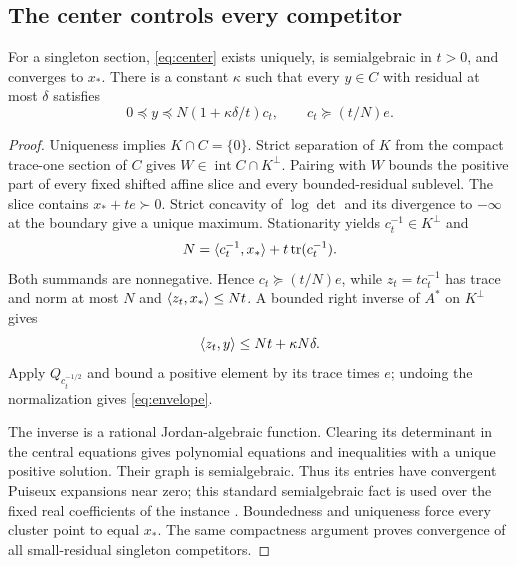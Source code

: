 \subsection{The center controls every competitor}
\begin{lemma}\label{lem:envelope}
For a singleton section, \eqref{eq:center} exists uniquely, is semialgebraic in $t>0$, and converges to $x_*$. There is a constant $\kappa$ such that every $y\in C$ with residual at most $\delta$ satisfies
\begin{equation}\label{eq:envelope}
 0\preceq y\preceq N(1+\kappa\delta/t)c_t,
 \qquad c_t\succeq(t/N)e.
\end{equation}
\end{lemma}
\begin{proof}
Uniqueness implies $K\cap C=\{0\}$. Strict separation of $K$ from the compact trace-one section of $C$ gives $W\in\operatorname{int}C\cap K^\perp$. Pairing with $W$ bounds the positive part of every fixed shifted affine slice and every bounded-residual sublevel. The slice contains $x_*+te\succ0$. Strict concavity of $\log\det$ and its divergence to $-\infty$ at the boundary give a unique maximum. Stationarity yields $c_t^{-1}\in K^\perp$ and
\begin{equation}\label{eq:trace}
 N=\langle c_t^{-1},x_*\rangle+t\operatorname{tr}(c_t^{-1}).
\end{equation}
Both summands are nonnegative. Hence $c_t\succeq(t/N)e$, while $z_t=tc_t^{-1}$ has trace and norm at most $N$ and $\langle z_t,x_*\rangle\le Nt$. A bounded right inverse of $A^*$ on $K^\perp$ gives
\[
 \langle z_t,y\rangle\le Nt+\kappa N\delta.
\]
Apply $Q_{c_t^{-1/2}}$ and bound a positive element by its trace times $e$; undoing the normalization gives \eqref{eq:envelope}.

The inverse is a rational Jordan-algebraic function. Clearing its determinant in the central equations gives polynomial equations and inequalities with a unique positive solution. Their graph is semialgebraic. Thus its entries have convergent Puiseux expansions near zero; this standard semialgebraic fact is used over the fixed real coefficients of the instance \cite{BCR98}. Boundedness and uniqueness force every cluster point to equal $x_*$. The same compactness argument proves convergence of all small-residual singleton competitors.
\end{proof}

